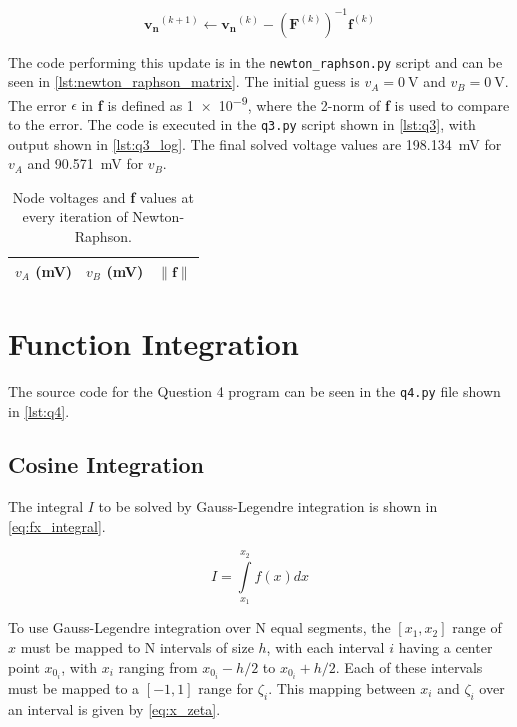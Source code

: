 \documentclass[a4paper,titlepage]{article}
\newcommand{\code}[1]{\texttt{#1}}
\begin{document}
	\begin{equation} \label{eq:newton_raphson_matrix}
		\mathbf{v_n}^{(k + 1)} \leftarrow \mathbf{v_n}^{(k)} - (\mathbf{F}^{(k)})^{-1} \mathbf{f}^{(k)}
	\end{equation}
	
	
	The code performing this update is in the \code{newton\_raphson.py} script and can be seen in \cref{lst:newton_raphson_matrix}. The initial guess is $v_A=\SI{0}{\volt}$ and $v_B=\SI{0}{\volt}$. The error $\epsilon$ in \textbf{f} is defined as \SI{1e-9}{}, where the 2-norm of \textbf{f} is used to compare to the error. The code is executed in the \code{q3.py} script shown in \cref{lst:q3}, with output shown in \cref{lst:q3_log}. The final solved voltage values are \SI{198.134}{\milli\volt} for $v_A$ and \SI{90.571}{\milli\volt} for $v_B$.
	
	
	\begin{table}[!htb]
		\centering
		\caption{Node voltages and \textbf{f} values at every iteration of Newton-Raphson.}
		\begin{tabular}{c | c | c}
			$v_A$ (mV) & $v_B$ (mV) & $\|\textbf{f}\|$ \\ \hline
			
		\end{tabular}
		\label{table:q3}
	\end{table}
	
	\section{Function Integration}
	The source code for the Question 4 program can be seen in the \texttt{q4.py} file shown in \cref{lst:q4}.
	
	\subsection{Cosine Integration}
	
	The integral $I$ to be solved by Gauss-Legendre integration is shown in \cref{eq:fx_integral}.
	
	\begin{equation} \label{eq:fx_integral}
		I = \int\limits_{x_1}^{x_2} f(x) dx 
	\end{equation}
	
	To use Gauss-Legendre integration over N equal segments, the $[x_1, x_2]$ range of $x$ must be mapped to N intervals of size $h$, with each interval $i$ having a center point $x_{0_i}$, with $x_i$ ranging from $x_{0_i} - h/2$ to $x_{0_i} + h/2$. Each of these intervals must be mapped to a $[-1, 1]$ range for $\zeta_i$. This mapping between $x_i$ and $\zeta_i$ over an interval is given by \cref{eq:x_zeta}.
	
\end{document}
